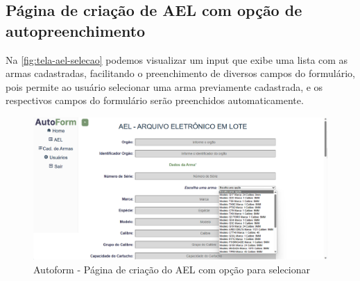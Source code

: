\subsection{Página de criação de AEL com opção de autopreenchimento}
Na \autoref{fig:tela-ael-selecao} podemos visualizar um input que exibe uma lista com as armas cadastradas, facilitando o preenchimento de diversos campos do formulário,
pois permite ao usuário selecionar uma arma previamente cadastrada, e os respectivos campos do formulário serão preenchidos automaticamente.

\begin{figure}[H]
    \caption{\label{fig:tela-ael-selecao}Autoform - Página de criação do AEL com opção para selecionar}
    \begin{center}
        \includegraphics[scale=0.3]{imagens/autoform-ael-selecao.png}
    \end{center}
\end{figure}

